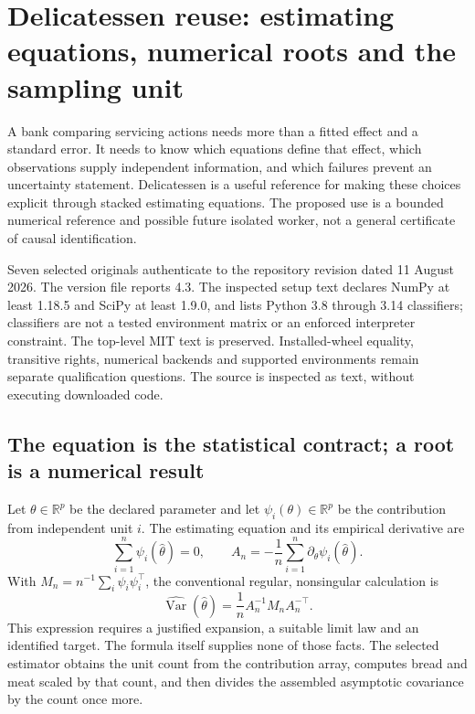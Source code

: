 \section{Delicatessen reuse: estimating equations, numerical roots and the sampling unit}
\label{sec:exec24-delicatessen-reuse}

A bank comparing servicing actions needs more than a fitted effect and a
standard error. It needs to know which equations define that effect, which
observations supply independent information, and which failures prevent an
uncertainty statement. Delicatessen is a useful reference for making these
choices explicit through stacked estimating equations. The proposed use is
a bounded numerical reference and possible future isolated worker, not a
general certificate of causal identification.\citep{exec24_delicatessen_source,exec24_delicatessen_choice}

Seven selected originals authenticate to the repository revision dated
11 August 2026. The version file reports 4.3. The inspected setup text
declares NumPy at least 1.18.5 and SciPy at least 1.9.0, and lists Python
3.8 through 3.14 classifiers; classifiers are not a tested environment
matrix or an enforced interpreter constraint. The top-level MIT text is
preserved. Installed-wheel equality, transitive rights, numerical backends
and supported environments remain separate qualification questions.
The source is inspected as text, without executing downloaded code.
\citep{exec24_delicatessen_source}

\subsection{The equation is the statistical contract; a root is a numerical result}
Let $\theta\in\mathbb R^p$ be the declared parameter and let
$\psi_i(\theta)\in\mathbb R^p$ be the contribution from independent unit
$i$. The estimating equation and its empirical derivative are
\[
 \sum_{i=1}^n\psi_i(\widehat\theta)=0,\qquad
 A_n=-\frac1n\sum_{i=1}^n\partial_\theta\psi_i(\widehat\theta).
\]
With $M_n=n^{-1}\sum_i\psi_i\psi_i^\top$, the conventional regular,
nonsingular calculation is
\[
 \widehat{\operatorname{Var}}(\widehat\theta)
   =\frac1n A_n^{-1}M_nA_n^{-\top}.
\]
This expression requires a justified expansion, a suitable limit law and
an identified target. The formula itself supplies none of those facts.
The selected estimator obtains the unit count from the contribution
array, computes bread and meat scaled by that count, and then divides
the assembled asymptotic covariance by the count once more.
\citep{exec24_delicatessen_source}

